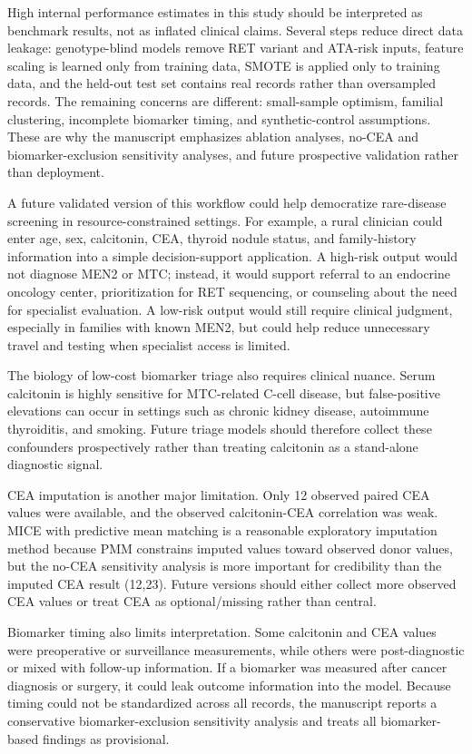 \documentclass[12pt]{article}
\begin{document}
High internal performance estimates in this study should be interpreted as benchmark results, not as inflated clinical claims. Several steps reduce direct data leakage: genotype-blind models remove RET variant and ATA-risk inputs, feature scaling is learned only from training data, SMOTE is applied only to training data, and the held-out test set contains real records rather than oversampled records. The remaining concerns are different: small-sample optimism, familial clustering, incomplete biomarker timing, and synthetic-control assumptions. These are why the manuscript emphasizes ablation analyses, no-CEA and biomarker-exclusion sensitivity analyses, and future prospective validation rather than deployment.

A future validated version of this workflow could help democratize rare-disease screening in resource-constrained settings. For example, a rural clinician could enter age, sex, calcitonin, CEA, thyroid nodule status, and family-history information into a simple decision-support application. A high-risk output would not diagnose MEN2 or MTC; instead, it would support referral to an endocrine oncology center, prioritization for RET sequencing, or counseling about the need for specialist evaluation. A low-risk output would still require clinical judgment, especially in families with known MEN2, but could help reduce unnecessary travel and testing when specialist access is limited.

The biology of low-cost biomarker triage also requires clinical nuance. Serum calcitonin is highly sensitive for MTC-related C-cell disease, but false-positive elevations can occur in settings such as chronic kidney disease, autoimmune thyroiditis, and smoking. Future triage models should therefore collect these confounders prospectively rather than treating calcitonin as a stand-alone diagnostic signal.

CEA imputation is another major limitation. Only 12 observed paired CEA values were available, and the observed calcitonin-CEA correlation was weak. MICE with predictive mean matching is a reasonable exploratory imputation method because PMM constrains imputed values toward observed donor values, but the no-CEA sensitivity analysis is more important for credibility than the imputed CEA result (12,23). Future versions should either collect more observed CEA values or treat CEA as optional/missing rather than central.

Biomarker timing also limits interpretation. Some calcitonin and CEA values were preoperative or surveillance measurements, while others were post-diagnostic or mixed with follow-up information. If a biomarker was measured after cancer diagnosis or surgery, it could leak outcome information into the model. Because timing could not be standardized across all records, the manuscript reports a conservative biomarker-exclusion sensitivity analysis and treats all biomarker-based findings as provisional.
\end{document}
